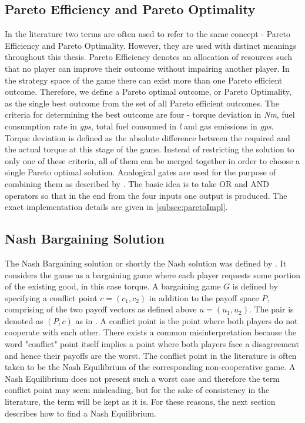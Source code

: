 {\subsection{Pareto Efficiency and Pareto Optimality}
\label{subsec:paretoFund}
In the literature two terms are often used to refer to the same concept - Pareto Efficiency and Pareto Optimality. However, they are used with distinct meanings throughout this thesis. Pareto Efficiency denotes an allocation of resources such that no player can improve their outcome without impairing another player. In the strategy space of the game there can exist more than one Pareto efficient outcome. Therefore, we define a Pareto optimal outcome, or Pareto Optimality, as the single best outcome from the set of all Pareto efficient outcomes. The criteria for determining the best outcome are four - torque deviation in \textit{Nm}, fuel consumption rate in \textit{gps}, total fuel consumed in \textit{l} and gas emissions in \textit{gps}. Torque deviation is defined as the absolute difference between the required and the actual torque at this stage of the game. Instead of restricting the solution to only one of these criteria, all of them can be merged together in order to choose a single Pareto optimal solution. Analogical gates are used for the purpose of combining them as described by \citet{badreddin1995analogical}. The basic idea is to take OR and AND operators so that in the end from the four inputs one output is produced. The exact implementation details are given in \ref{subsec:paretoImpl}.

\subsection{Nash Bargaining Solution}
\label{subsec:nashbargFun}
The Nash Bargaining solution or shortly the Nash solution was defined by \citet{nash1950bargaining}. It considers the game as a bargaining game where each player requests some portion of the existing good, in this case torque. A bargaining game $G$ is defined by specifying a conflict point $c = (c_1,c_2)$ in addition to the payoff space $P$, comprising of the two payoff vectors as defined above $u = (u_1,u_2)$. The pair is denoted as $(P,c)$ as in \citet{holler2006einfuhrung}. A conflict point is the point where both players do not cooperate with each other. There exists a common misinterpretation because the word "conflict" point itself implies a point where both players face a disagreement and hence their payoffs are the worst. The conflict point in the literature is often taken to be the Nash Equilibrium of the corresponding non-cooperative game. A Nash Equilibrium does not present such a worst case and therefore the term conflict point may seem misleading, but for the sake of consistency in the literature, the term will be kept as it is. For these reasons, the next section describes how to find a Nash Equilibrium.

}
